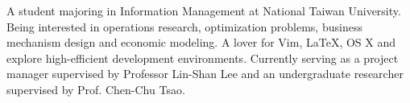 

\begin{cvparagraph}

A student majoring in Information Management at National Taiwan University. 
Being interested in operations research, optimization problems, business mechanism design
and economic modeling. 
A lover for Vim, 
\LaTeX, OS X and explore high-efficient development environments. 
Currently serving as a project manager supervised by Professor Lin-Shan Lee and an 
undergraduate researcher supervised by Prof. Chen-Chu Tsao.
\end{cvparagraph}
